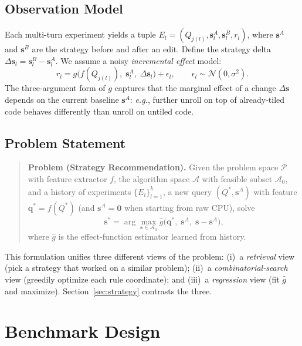 \documentclass{article}
\begin{document}
\subsection{Observation Model}
Each multi-turn experiment yields a tuple
$E_l = (Q_{j(l)}, \mathbf{s}_l^A, \mathbf{s}_l^B, r_l)$, where
$\mathbf{s}^A$ and $\mathbf{s}^B$ are the strategy before and after
an edit. Define the strategy delta
$\Delta \mathbf{s}_l = \mathbf{s}_l^B - \mathbf{s}_l^A$.
We assume a noisy \emph{incremental effect} model:
\begin{equation}
r_l = g\bigl(f(Q_{j(l)}),\; \mathbf{s}_l^A,\; \Delta \mathbf{s}_l\bigr)
      + \epsilon_l, \qquad
\epsilon_l \sim \mathcal{N}(0, \sigma^2).
\label{eq:incremental}
\end{equation}
The three-argument form of $g$ captures that the marginal effect of a
change $\Delta\mathbf{s}$ depends on the current baseline
$\mathbf{s}^A$: \emph{e.g.}, further unroll on top of already-tiled code
behaves differently than unroll on untiled code.

\subsection{Problem Statement}
\label{sec:problem}
\begin{quote}
\textbf{Problem (Strategy Recommendation).}
Given the problem space $\mathcal{P}$ with feature extractor $f$,
the algorithm space $\mathcal{A}$ with feasible subset
$\mathcal{A}_0$, and a history of experiments
$\{E_l\}_{l=1}^{k}$, a new query
$(Q^*, \mathbf{s}^A)$ with feature
$\mathbf{q}^* = f(Q^*)$ (and $\mathbf{s}^A = \mathbf{0}$ when starting
from raw CPU), solve
\begin{equation}
\mathbf{s}^* = \arg\max_{\mathbf{s} \in \mathcal{A}_0}
  \hat{g}\bigl(\mathbf{q}^*,\; \mathbf{s}^A,\; \mathbf{s} - \mathbf{s}^A\bigr),
\label{eq:objective}
\end{equation}
where $\hat{g}$ is the effect-function estimator learned from history.
\end{quote}

This formulation unifies three different views of the problem: (i)~a
\emph{retrieval} view (pick a strategy that worked on a similar
problem); (ii)~a \emph{combinatorial-search} view (greedily optimize
each rule coordinate); and (iii)~a \emph{regression} view (fit
$\hat{g}$ and maximize). Section~\ref{sec:strategy} contrasts the
three.

\section{Benchmark Design}
\label{sec:design}
\end{document}
